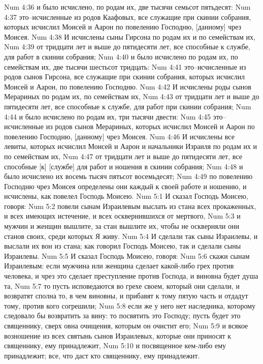 Num 4:36  и было исчислено, по родам их, две тысячи семьсот пятьдесят:
Num 4:37  это--исчисленные из родов Каафовых, все служащие при скинии собрания, которых исчислил Моисей и Аарон по повелению Господню, [данному] чрез Моисея.
Num 4:38  И исчислены сыны Гирсона по родам их и по семействам их,
Num 4:39  от тридцати лет и выше до пятидесяти лет, все способные к службе, для работ в скинии собрания;
Num 4:40  и было исчислено по родам их, по семействам их, две тысячи шестьсот тридцать:
Num 4:41  это--исчисленные из родов сынов Гирсона, все служащие при скинии собрания, которых исчислил Моисей и Аарон, по повелению Господню.
Num 4:42  И исчислены роды сынов Мерариных по родам их, по семействам их,
Num 4:43  от тридцати лет и выше до пятидесяти лет, все способные к службе, для работ при скинии собрания;
Num 4:44  и было исчислено по родам их, три тысячи двести:
Num 4:45  это--исчисленные из родов сынов Мерариных, которых исчислил Моисей и Аарон по повелению Господню, [данному] чрез Моисея.
Num 4:46  И исчислены все левиты, которых исчислил Моисей и Аарон и начальники Израиля по родам их и по семействам их,
Num 4:47  от тридцати лет и выше до пятидесяти лет, все способные [к] [службе] для работ и ношения в скинии собрания;
Num 4:48  и было исчислено их восемь тысяч пятьсот восемьдесят;
Num 4:49  по повелению Господню чрез Моисея определены они каждый к своей работе и ношению, и исчислены, как повелел Господь Моисею.
Num 5:1  И сказал Господь Моисею, говоря:
Num 5:2  повели сынам Израилевым выслать из стана всех прокаженных, и всех имеющих истечение, и всех осквернившихся от мертвого,
Num 5:3  и мужчин и женщин вышлите, за стан вышлите их, чтобы не оскверняли они станов своих, среди которых Я живу.
Num 5:4  И сделали так сыны Израилевы, и выслали их вон из стана; как говорил Господь Моисею, так и сделали сыны Израилевы.
Num 5:5  И сказал Господь Моисею, говоря:
Num 5:6  скажи сынам Израилевым: если мужчина или женщина сделает какой-либо грех против человека, и чрез это сделает преступление против Господа, и виновна будет душа та,
Num 5:7  то пусть исповедаются во грехе своем, который они сделали, и возвратят сполна то, в чем виновны, и прибавят к тому пятую часть и отдадут тому, против кого согрешили;
Num 5:8  если же у него нет наследника, которому следовало бы возвратить за вину: то посвятить это Господу; пусть будет это священнику, сверх овна очищения, которым он очистит его;
Num 5:9  и всякое возношение из всех святынь сынов Израилевых, которые они приносят к священнику, ему принадлежит,
Num 5:10  и посвященное кем-либо ему принадлежит; все, что даст кто священнику, ему принадлежит.
